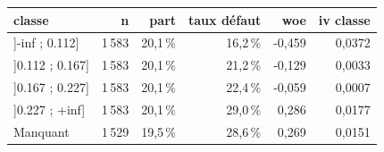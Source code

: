 \begin{tabular}{lrrrrr}
\toprule
\textbf{classe} & \textbf{n} & \textbf{part} & \textbf{taux défaut} & \textbf{woe} & \textbf{iv classe} \\
\midrule
]-inf ; 0.112] & 1\,583 & 20,1\,\% & 16,2\,\% & -0,459 & 0,0372 \\
]0.112 ; 0.167] & 1\,583 & 20,1\,\% & 21,2\,\% & -0,129 & 0,0033 \\
]0.167 ; 0.227] & 1\,583 & 20,1\,\% & 22,4\,\% & -0,059 & 0,0007 \\
]0.227 ; +inf] & 1\,583 & 20,1\,\% & 29,0\,\% & 0,286 & 0,0177 \\
Manquant & 1\,529 & 19,5\,\% & 28,6\,\% & 0,269 & 0,0151 \\
\bottomrule
\end{tabular}
